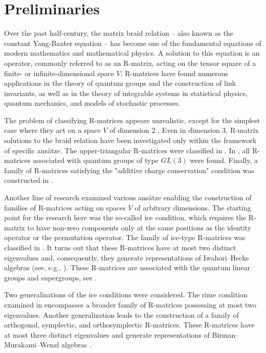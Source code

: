 \documentclass[11pt]{article}
\begin{document}
\section{Preliminaries}

Over the past half-century, the matrix braid relation -- also known as the constant Yang-Baxter equation --  has become one of the fundamental equations of modern mathematics and mathematical physics. 
A solution to this equation is an operator, commonly referred to as an R-matrix, acting on the tensor square of a finite- or infinite-dimensional space $V$.
R-matrices have found numerous applications in the theory of quantum groups and the construction of link invariants, as well as in the theory of integrable systems in statistical physics, quantum mechanics, and models of stochastic processes.

The problem of classifying R-matrices appears unrealistic, except for the simplest case where they act on a space $V$ of dimension 2 \cite{H1,H2}.
Even in dimension 3, R-matrix solutions to the braid relation have been investigated only within the framework of specific ansätze. The upper-triangular R-matrices were classified in \cite{H3}.	In \cite{EO}, all R-matrices associated with quantum groups of type $GL(3)$ were found.  Finally, a family of R-matrices satisfying the "additive charge conservation" condition was constructed in \cite{HMR}.

Another line of research examined various ansätze enabling the construction of families of R-matrices acting on spaces $V$ of arbitrary dimensions.  
The starting point for the research here was the so-called ice condition, which requires the R-matrix to have non-zero components only at the same positions as the identity operator or the permutation operator. The family of ice-type R-matrices
was classified in \cite{O}. It turns out that these R-matrices have at most two distinct eigenvalues  and, consequently, they generate representations of Iwahori–Hecke algebras (see, e.g., \cite{Jo}). These R-matrices are associated with the quantum linear groups 
and supergroups,
 see \cite{O,I,GPS}.

Two generalizations of the ice conditions were considered.
The rime condition examined in \cite{OP} encompasses a broader family of R-matrices possessing at most two eigenvalues. 
Another generalization \cite{I} leads to the construction of a family of orthogonal, symplectic, and orthosymplectic 
R-matrices. These R-matrices have at most three distinct eigenvalues
and generate representations of Birman–Murakami–Wenzl algebras \cite{BW,M1}.
\end{document}
